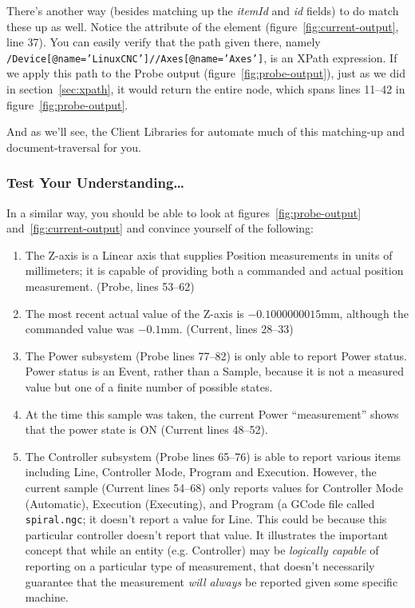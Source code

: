 There's another way (besides matching up the \emph{itemId} and \emph{id}
fields) to do match these up as well.  Notice the  attribute of
the  element (figure~\ref{fig:current-output}, line 37).  You
can easily verify that the path given there, namely 
\texttt{/Device[@name='LinuxCNC']//Axes[@name='Axes']}, is an XPath
expression.  If we apply this path to the Probe output
(figure~\ref{fig:probe-output}), 
just as we did in section~\ref{sec:xpath},
it would return the entire 
node, which spans lines 11--42 in figure~\ref{fig:probe-output}.  

And as we'll see, the Client Libraries for \mtc{} automate much of this
matching-up and document-traversal for you.

\subsubsection{Test Your Understanding\ldots}

In a similar way, you should be able to look at
figures~\ref{fig:probe-output} and~\ref{fig:current-output} and convince
yourself of the following:

\begin{enumerate}
\item The Z-axis is a Linear axis that supplies Position measurements in
  units of millimeters; it is capable of providing both a commanded and
  actual position measurement.  (Probe, lines 53--62)
\item The most recent actual value of the Z-axis is $-0.1000000015$mm,
  although the commanded value was $-0.1$mm.  (Current, lines 28--33)
\item The Power subsystem (Probe lines 77--82) is only able to report
  Power status.  Power status is an Event, rather than a Sample, because
  it is not a measured value but one of a finite number of possible
  states.  
\item At the time this sample was taken, the current Power
  ``measurement'' shows that the power state is ON (Current lines
  48--52).
\item The Controller subsystem (Probe lines 65--76) is able to report
  various items including Line, Controller Mode, Program and Execution.
  However, the current sample (Current lines 54--68) only reports values
  for Controller Mode (Automatic), Execution (Executing), and Program (a
  GCode file called \texttt{spiral.ngc}; it doesn't report a value for
  Line.  This could be because this particular controller doesn't report
  that value.  It illustrates the important concept that while an entity
  (e.g. Controller) may be \emph{logically capable} of reporting on a
  particular type of measurement, that doesn't necessarily guarantee
  that the measurement \emph{will always} be reported given some
  specific machine. 
\end{enumerate}

